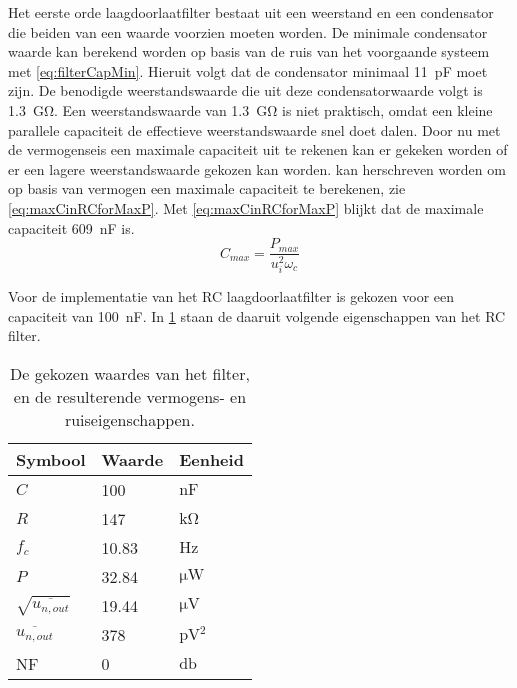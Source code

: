 Het eerste orde laagdoorlaatfilter bestaat uit een weerstand en een condensator die beiden van een waarde voorzien moeten worden. De minimale condensator waarde kan berekend worden op basis van de ruis van het voorgaande systeem met \cref{eq:filterCapMin}.
Hieruit volgt dat de condensator minimaal \qty{11}{\pico\farad} moet zijn. De benodigde weerstandswaarde die uit deze condensatorwaarde volgt is \qty{1.3}{\giga\ohm}. Een weerstandswaarde van \qtylist{1.3}{\giga\ohm} is niet praktisch, omdat een kleine parallele capaciteit de effectieve weerstandswaarde snel doet dalen. Door nu met de vermogenseis een maximale capaciteit uit te rekenen kan er gekeken worden of er een lagere weerstandswaarde gekozen kan worden.  kan herschreven worden om op basis van vermogen een maximale capaciteit te berekenen, zie \cref{eq:maxCinRCforMaxP}. Met \cref{eq:maxCinRCforMaxP} blijkt dat de maximale capaciteit \qty{609}{\nano\farad} is.
\begin{equation}\label{eq:maxCinRCforMaxP}
    C_{max}=\frac{P_{max}}{u_i^2\omega_c}
\end{equation}

Voor de implementatie van het RC laagdoorlaatfilter is gekozen voor een capaciteit van \qty{100}{\nano\farad}. In \cref{tab:filterValues} staan de daaruit volgende eigenschappen van het RC filter.

\begin{table}[!htb]
    \centering
    \begin{tabular}{l|l|l}
        Symbool & Waarde & Eenheid \\
        \hline
        $C$         & 100    & $\si{\nano\farad}$\\
        $R$         & 147   & $\si{\kilo\ohm}$  \\
        $f_c$       & 10.83  & $\si{\hertz}$     \\
        $P$         & 32.84   & $\si{\micro\watt}$ \\
        $\sqrt{\overline{u_{n,out}}}$ & 19.44   & $\si{\micro\volt}$ \\
        $\overline{u_{n,out}}$ & 378 & $\si{\pico\volt^2}$\\
        NF          & 0  & $\si{\decibel}$   \\
    \end{tabular}
    \caption{De gekozen waardes van het filter, en de resulterende vermogens- en ruiseigenschappen.}
    \label{tab:filterValues}
\end{table}

